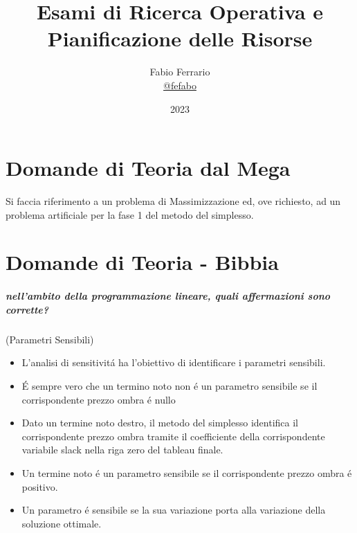 \documentclass[12pt, a4paper, openany]{book}
\begin{document}
\title{Esami di Ricerca Operativa e Pianificazione delle Risorse}
\author{
	Fabio Ferrario\\
	\small{\href{https://t.me/fefabo}{@fefabo}}
}

\date{2023}
\maketitle


\tableofcontents

\chapter{Domande di Teoria dal Mega}
Si faccia riferimento a un problema di Massimizzazione ed, ove richiesto, ad un problema artificiale per la fase 1 del metodo del simplesso.



\chapter{Domande di Teoria - Bibbia}
\paragraph{nell'ambito della programmazione lineare, quali affermazioni sono corrette?} (Parametri Sensibili)
\begin{itemize}
    \item L'analisi di sensitivitá ha l'obiettivo di identificare i parametri sensibili.
    \item É sempre vero che un termino noto non é un parametro sensibile se il corrispondente prezzo ombra é nullo
    \item Dato un termine noto destro, il metodo del simplesso identifica il corrispondente prezzo ombra tramite il coefficiente della corrispondente variabile slack nella riga zero del tableau finale.
    \item Un termine noto é un parametro sensibile se il corrispondente prezzo ombra é positivo.
    \item Un parametro é sensibile se la sua variazione porta alla variazione della soluzione ottimale.
\end{itemize}
\end{document}
